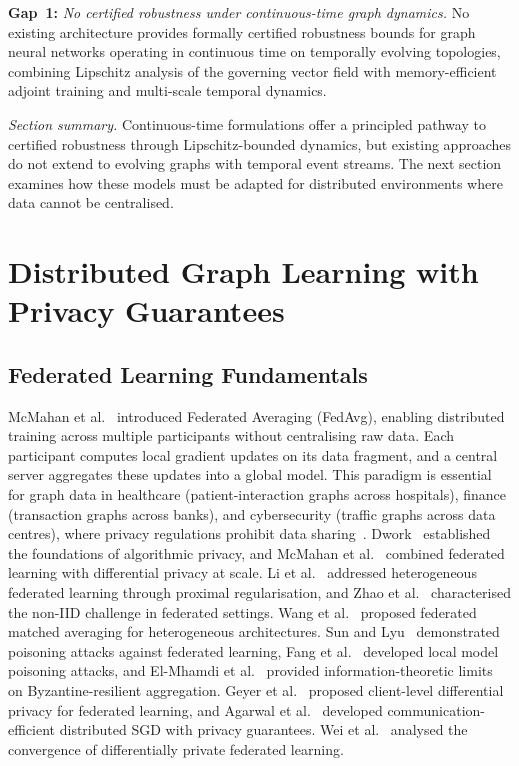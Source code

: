 \medskip
\noindent\textbf{Gap~1:} \emph{No certified robustness under continuous-time graph dynamics.} No existing architecture provides formally certified robustness bounds for graph neural networks operating in continuous time on temporally evolving topologies, combining Lipschitz analysis of the governing vector field with memory-efficient adjoint training and multi-scale temporal dynamics.

\medskip
\noindent\textit{Section summary.} Continuous-time formulations offer a principled pathway to certified robustness through Lipschitz-bounded dynamics, but existing approaches do not extend to evolving graphs with temporal event streams. The next section examines how these models must be adapted for distributed environments where data cannot be centralised.


\section{Distributed Graph Learning with Privacy Guarantees}
\label{sec:distributed}

\subsection{Federated Learning Fundamentals}

McMahan et al.~\cite{McMahan2017} introduced Federated Averaging (FedAvg), enabling distributed training across multiple participants without centralising raw data. Each participant computes local gradient updates on its data fragment, and a central server aggregates these updates into a global model. This paradigm is essential for graph data in healthcare (patient-interaction graphs across hospitals), finance (transaction graphs across banks), and cybersecurity (traffic graphs across data centres), where privacy regulations prohibit data sharing~\cite{Kairouz2021,Konecny2016,Mothukuri2021}. Dwork~\cite{Dwork2014} established the foundations of algorithmic privacy, and McMahan et al.~\cite{McMahan2018dp} combined federated learning with differential privacy at scale. Li et al.~\cite{Li2020fedprox} addressed heterogeneous federated learning through proximal regularisation, and Zhao et al.~\cite{Zhao2020fl_noniid} characterised the non-IID challenge in federated settings. Wang et al.~\cite{Wang2020fedma} proposed federated matched averaging for heterogeneous architectures. Sun and Lyu~\cite{Sun2019fl_poison} demonstrated poisoning attacks against federated learning, Fang et al.~\cite{Fang2020} developed local model poisoning attacks, and El-Mhamdi et al.~\cite{ElMhamdi2018} provided information-theoretic limits on Byzantine-resilient aggregation. Geyer et al.~\cite{Geyer2017} proposed client-level differential privacy for federated learning, and Agarwal et al.~\cite{Agarwal2018cpsgd,Bernstein2017,Bernstein2019} developed communication-efficient distributed SGD with privacy guarantees. Wei et al.~\cite{Wei2020dpfl} analysed the convergence of differentially private federated learning.


